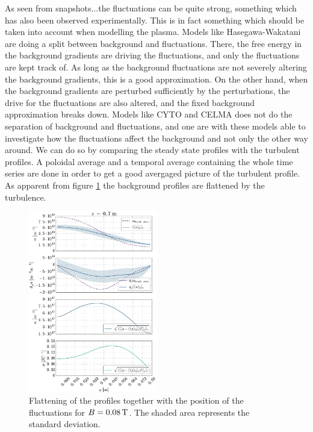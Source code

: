 As seen from snapshots...the fluctuations can be quite strong, something which has also been observed experimentally.
This is in fact something which should be taken into account when modelling the plasma.
Models like Hasegawa-Wakatani are doing a split between background and fluctuations.
There, the free energy in the background gradients are driving the fluctuations, and only the fluctuations are kept track of.
As long as the background fluctuations are not severely altering the background gradients, this is a good approximation.
On the other hand, when the background gradients are perturbed sufficiently by the perturbations, the drive for the fluctuations are also altered, and the fixed background approximation breaks down.
Models like CYTO and CELMA does not do the separation of background and fluctuations, and one are with these models able to investigate how the fluctuations affect the background and not only the other way around.
We can do so by comparing the steady state profiles with the turbulent profiles.
A poloidal average and a temporal average containing the whole time series are done in order to get a good avergaged picture of the turbulent profile.
As apparent from figure \cref{fig:posOfFluct008} the background profiles are flattened by the turbulence.
%
\begin{figure}[htb]
    \centering
    \includegraphics[width=0.5\textwidth]{fig/results/posOfFluct/posOfFluctB008}
    \caption{Flattening of the profiles together with the position of the fluctuations for $B=0.08\, \text{T}$.
        The shaded area represents the standard deviation.
    }
    \label{fig:posOfFluct008}
\end{figure}
%

